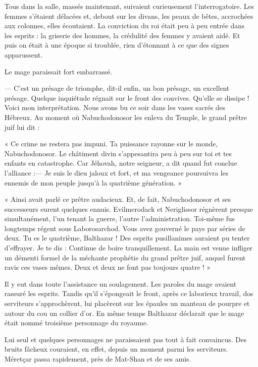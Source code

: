 \documentclass[a4paper, 11pt, oneside, polutonikogreek, french]{article}
\begin{document}
Tous dans la salle, massés maintenant, suivaient curieusement l'interrogatoire. Les femmes s'étaient délacées et, debout sur les divans, les peaux de bêtes, accrochées aux colonnes, elles écoutaient. La conviction du roi était peu à peu entrée dans les esprits : la griserie des hommes, la crédulité des femmes y avaient aidé. Et puis on était à une époque si troublée, rien d'étonnant à ce que des signes apparussent.

Le mage paraissait fort embarrassé.

--- C'est un présage de triomphe, dit-il enfin, un bon présage, un excellent présage. Quelque inquiétude régnait sur le front des convives. Qu'elle se dissipe ! Voici mon interprétation. Nous avons bu ce soir dans les vases sacrés des Hébreux. Au moment où Nabuchodonosor les enleva du Temple, le grand prêtre juif lui dit :

« Ce crime ne restera pas impuni. Ta puissance rayonne sur le monde, Nabuchodonosor. Le châtiment divin s'appesantira peu à peu sur toi et tes enfants en catastrophe. Car Jéhovah, notre seigneur, a dit quand fut conclue l'alliance :--- Je suis le dieu jaloux et fort, et ma vengeance poursuivra les ennemis de mon peuple jusqu'à la quatrième génération. »

« Ainsi avait parlé ce prêtre audacieux. Et, de fait, Nabuchodonosor et ses successeurs eurent quelques ennuis. Evilmerodack et Neriglissor régnèrent presque simultanément, l'un tenant la guerre, l'autre l'administration. Toi-même fus longtemps régent sous Laborosarchod. Vous avez gouverné le pays par séries de deux. Tu es le quatrième, Balthazar ! Des esprits pusillanimes auraient pu tenter d'effrayer. Je te dis : Continue de boire tranquillement. La main est venue infliger un démenti formel de la méchante prophétie du grand prêtre juif, auquel furent ravis ces vases mêmes. Deux et deux ne font pas toujours quatre ! »

Il y eut dans toute l'assistance un soulagement. Les paroles du mage avaient rassuré les esprits. Tandis qu'il s'épongeait le front, après ce laborieux travail, dos serviteurs s'approchèrent, lui placèrent sur les épaules un manteau de pourpre et autour du cou un collier d'or. En même temps Balthazar déclarait que le mage était nommé troisième personnage du royaume.

\bigskip
\centerline{\EightStarTaper}
\centerline{\EightStarTaper\EightStarTaper}
\bigskip

Lui seul et quelques personnages ne paraissaient pas tout à fait convaincus. Des bruits fâcheux couraient, en effet, depuis un moment parmi les serviteurs. Méretçar passa rapidement, près de Mat-Shan et de ses amis.
\end{document}
